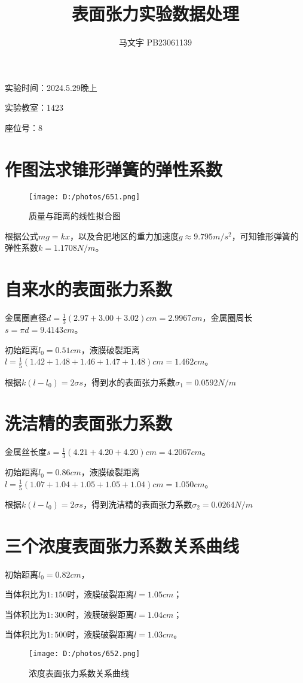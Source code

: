 \documentclass[UTF8]{ctexart}
\title{表面张力实验数据处理}
\author{马文宇 PB23061139 }
\begin{document}
\maketitle
实验时间：2024.5.29晚上

实验教室：1423

座位号：8

\section{作图法求锥形弹簧的弹性系数}

\begin{figure}[!htp]
    \centering
    \texttt{[image: D:/photos/651.png]}
    \caption{质量与距离的线性拟合图}
\end{figure}

根据公式$mg=kx$，以及合肥地区的重力加速度$g\approx9.795m/s^2$，可知锥形弹簧的弹性系数$k=1.1708N/m$。

\section{自来水的表面张力系数}

金属圈直径$d=\frac{1}{3}(2.97+3.00+3.02)cm=2.9967cm$，金属圈周长$s=\pi d=9.4143cm$。

初始距离$l_0=0.51cm$，液膜破裂距离$l=\frac{1}{5}(1.42+1.48+1.46+1.47+1.48)cm=1.462cm$。

根据$k(l-l_0)=2\sigma s$，得到水的表面张力系数$\sigma_1=0.0592N/m$

\section{洗洁精的表面张力系数}

金属丝长度$s=\frac{1}{3}(4.21+4.20+4.20)cm=4.2067cm$。

初始距离$l_0=0.86cm$，液膜破裂距离$l=\frac{1}{5}(1.07+1.04+1.05+1.05+1.04)cm=1.050cm$。

根据$k(l-l_0)=2\sigma s$，得到洗洁精的表面张力系数$\sigma_2=0.0264N/m$

\section{三个浓度表面张力系数关系曲线}

初始距离$l_0=0.82cm$，

当体积比为$1:150$时，液膜破裂距离$l=1.05cm$；

当体积比为$1:300$时，液膜破裂距离$l=1.04cm$；

当体积比为$1:500$时，液膜破裂距离$l=1.03cm$。

\begin{figure}[!htp]
    \centering
    \texttt{[image: D:/photos/652.png]}
    \caption{浓度表面张力系数关系曲线}
\end{figure}
\end{document}
